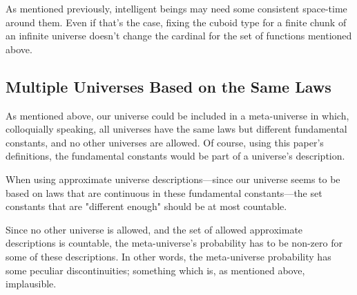 \documentclass[a4paper
,draft
]{article}
\def\reale{\mathbb{R}}
\newcommand{\ghilimele}[1]{``#1"}
\begin{document}
As mentioned previously, intelligent beings may need some consistent space-time
around them. Even if that's the case, fixing the cuboid type for a finite
chunk of an infinite universe doesn't change the cardinal for the set of
functions mentioned above.

\subsection {Multiple Universes Based on the Same Laws}

As mentioned above, our universe could be included in a meta-universe in which,
colloquially speaking, all universes have the same laws
but different fundamental constants, and no other universes are allowed.
Of course, using this paper's definitions,
the fundamental constants would be part of a universe's description.

When using approximate universe descriptions---since our universe
seems to be based on laws that are continuous in these fundamental constants---the
set constants that are "different enough" should be at most countable.

Since no other universe is allowed, and the set of allowed approximate
descriptions is countable, the meta-universe's probability
has to be non-zero for some of these descriptions. In other words, the
meta-universe probability has some peculiar discontinuities; something which is, as
mentioned above, implausible.




\end{document}

